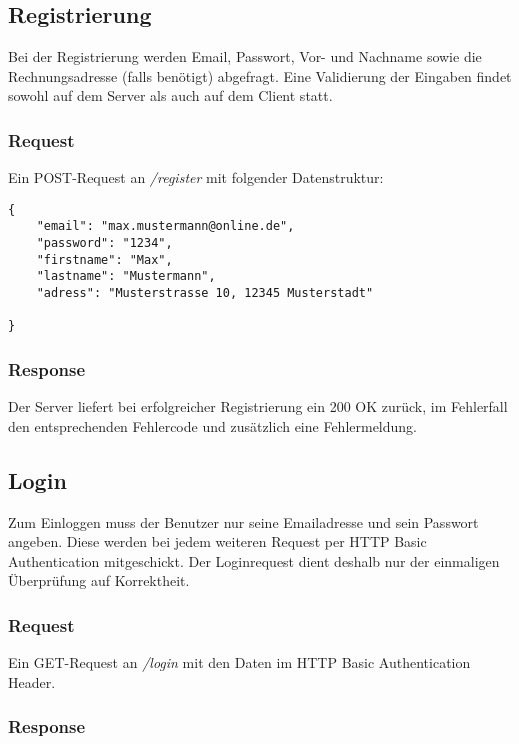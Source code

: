 \documentclass[ngerman]{scrartcl}
\begin{document}
	\subsection{Registrierung}
	
	Bei der Registrierung werden Email, Passwort, Vor- und Nachname sowie die Rechnungsadresse (falls benötigt) abgefragt. 
	Eine Validierung der Eingaben findet sowohl auf dem Server als auch auf dem Client statt.
	
		\subsubsection*{Request}
		
		Ein POST-Request an \textit{/register} mit folgender Datenstruktur:
		
		\begin{lstlisting}
{
	"email": "max.mustermann@online.de",
	"password": "1234",
	"firstname": "Max",
	"lastname": "Mustermann",
	"adress": "Musterstrasse 10, 12345 Musterstadt"
	
}
		\end{lstlisting}
		
		\subsubsection*{Response}
		
		Der Server liefert bei erfolgreicher Registrierung ein 200 OK zurück, im Fehlerfall den entsprechenden Fehlercode und zusätzlich eine Fehlermeldung.
		
	\subsection{Login}
	
	Zum Einloggen muss der Benutzer nur seine Emailadresse und sein Passwort angeben.
	Diese werden bei jedem weiteren Request per HTTP Basic Authentication mitgeschickt.
	Der Loginrequest dient deshalb nur der einmaligen Überprüfung auf Korrektheit.
	
		\subsubsection*{Request}
		
		Ein GET-Request an \textit{/login} mit den Daten im HTTP Basic Authentication Header.
		
		\subsubsection*{Response}
		
\end{document}
